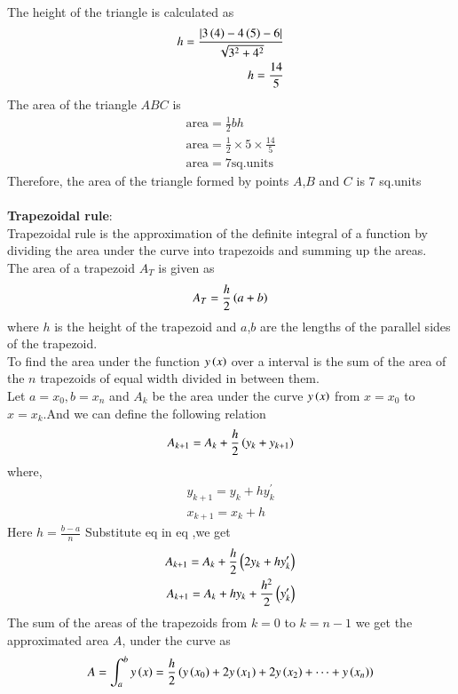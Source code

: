 \documentclass[journal]{IEEEtran}
\begin{document}
The height of the triangle is calculated as 
\begin{align}
    h=\frac{\left\vert3\left(4\right)-4\left(5\right)-6\right\vert}{\sqrt{3^2+4^2}}\\
    h=\frac{14}{5}
\end{align}
The area of the triangle $ABC$ is 
\begin{align}
    \text{area}=\frac{1}{2}bh\\
    \text{area}=\frac{1}{2}\times5\times\frac{14}{5}\\
    \text{area}=7 \text{sq.units}
\end{align}
Therefore, the area of the triangle formed by points $A$,$B$ and $C$ is 7 sq.units\\\\
\textbf{Trapezoidal rule}:\\
Trapezoidal rule is the approximation of the definite integral of a function by dividing the area under the curve into trapezoids and summing up the areas.\\The area of a trapezoid $A_T$ is given as 
\begin{align}
    A_T=\frac{h}{2}\left(a+b\right)
\end{align}
where $h$ is the height of the trapezoid and $a$,$b$ are the lengths of the parallel sides of the trapezoid. \\
To find the area under the function $y\left(x\right)$ over a interval  is the sum of the area of the $n$ trapezoids of equal width divided in between them.\\
Let $a=x_0,b=x_n$ and $A_k$ be the area under the curve $y\left(x\right)$ from $x=x_0$ to $x=x_k$.And we  can define the following relation
\begin{align}
    A_{k+1}=A_k+\frac{h}{2}\left(y_k+y_{k+1}\right)
\end{align}
where,
\begin{align}
    y_{k+1}=y_k+hy^\prime_k\\
    x_{k+1}=x_k+h
\end{align}
Here $h=\frac{b-a}{n}$
Substitute eq  in eq ,we get
\begin{align}
    A_{k+1}=A_k+\frac{h}{2}\left(2y_k+hy^\prime_k\right)\\
    A_{k+1}=A_k+hy_k+\frac{h^2}{2}\left(y^\prime_k\right)
\end{align}
The sum of the areas of the trapezoids from $k=0$ to $k=n-1$ we get the approximated area $A$, under the curve as
\begin{align}
A=\int_a^by\left(x\right)=\frac{h}{2}\left(y\left(x_0\right)+2y\left(x_1\right)+2y\left(x_2\right)+\dots+y\left(x_n\right)\right)
\end{align}
\end{document}
